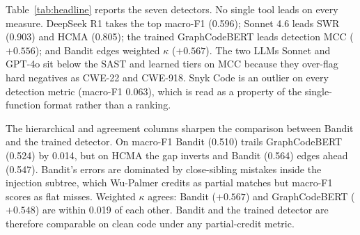 Table~\ref{tab:headline} reports the seven detectors. No single tool leads on
every measure. DeepSeek R1 takes the top macro-F1 (0.596); Sonnet 4.6 leads SWR
(0.903) and HCMA (0.805); the trained GraphCodeBERT leads detection MCC
($+0.556$); and Bandit edges weighted $\kappa$ ($+0.567$). The two LLMs Sonnet
and GPT-4o sit below the SAST and learned tiers on MCC because they over-flag
hard negatives as CWE-22 and CWE-918. Snyk Code is an outlier on every detection
metric (macro-F1 0.063), which is read as a property of the single-function
format rather than a ranking.

\begin{table}[htb]
\caption{Detector results on the 129-sample clean test set. Macro-F1 is
one-versus-rest across seven CWEs; MCC is on the binary vulnerable/safe collapse;
SWR is severity-weighted recall on the 27 CVSS-scored positives; HCMA is
hierarchical accuracy; $\kappa_w$ is weighted Cohen's $\kappa$; Comp.\ is
macro-F1 on the composed mutator; $\Delta$F1$^\star$ is the worst-case
single-mutator drop (positives only).}
\label{tab:headline}
\centering
{}
\end{table}

The hierarchical and agreement columns sharpen the comparison between Bandit and
the trained detector. On macro-F1 Bandit (0.510) trails GraphCodeBERT (0.524) by
0.014, but on HCMA the gap inverts and Bandit (0.564) edges ahead (0.547).
Bandit's errors are dominated by close-sibling mistakes inside the injection
subtree, which Wu-Palmer credits as partial matches but macro-F1 scores as flat
misses. Weighted $\kappa$ agrees: Bandit ($+0.567$) and GraphCodeBERT ($+0.548$)
are within 0.019 of each other. Bandit and the trained detector are therefore
comparable on clean code under any partial-credit metric.

